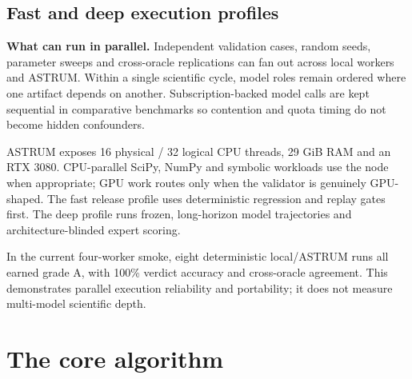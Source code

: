 \documentclass[10pt,a4paper]{article}
\begin{document}
\subsection*{Fast and deep execution profiles}

\begin{plainbox}
\textbf{What can run in parallel.} Independent validation cases, random seeds,
parameter sweeps and cross-oracle replications can fan out across local workers and
ASTRUM. Within a single scientific cycle, model roles remain ordered where one artifact
depends on another. Subscription-backed model calls are kept sequential in comparative
benchmarks so contention and quota timing do not become hidden confounders.
\end{plainbox}

ASTRUM exposes 16 physical / 32 logical CPU threads, 29 GiB RAM and an RTX 3080.
CPU-parallel SciPy, NumPy and symbolic workloads use the node when appropriate; GPU
work routes only when the validator is genuinely GPU-shaped. The fast release profile
uses deterministic regression and replay gates first. The deep profile runs frozen,
long-horizon model trajectories and architecture-blinded expert scoring.

In the current four-worker smoke, eight deterministic local/ASTRUM runs all earned
grade A, with 100\% verdict accuracy and cross-oracle agreement. This demonstrates
parallel execution reliability and portability; it does not measure multi-model
scientific depth.

\section*{The core algorithm}
\end{document}
